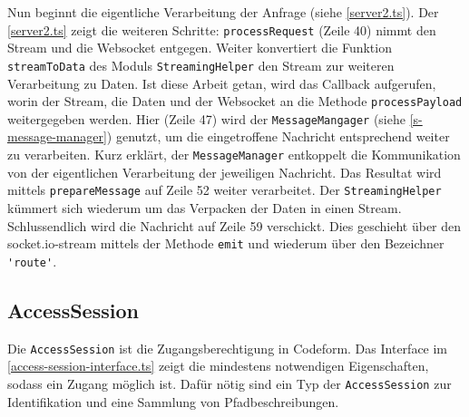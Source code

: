 
Nun beginnt die eigentliche Verarbeitung der Anfrage (siehe \autoref{server2.ts}). Der \autoref{server2.ts} zeigt die weiteren Schritte: \verb|processRequest| (Zeile 40) nimmt den \gls{Stream} und die \gls{Websocket} entgegen. Weiter konvertiert die Funktion \texttt{stream\-To\-Da\-ta} des Moduls \verb|StreamingHelper| den \gls{Stream} zur weiteren Verarbeitung zu Daten. Ist diese Arbeit getan, wird das \gls{Callback} aufgerufen, worin der \gls{Stream}, die Daten und der \gls{Websocket} an die Methode \verb|processPayload| weitergegeben werden. Hier (Zeile 47) wird der \texttt{MessageMangager} (siehe \autoref{s-message-manager}) genutzt, um die eingetroffene Nachricht entsprechend weiter zu verarbeiten. Kurz erklärt, der \texttt{MessageManager} entkoppelt die Kommunikation von der eigentlichen Verarbeitung der jeweiligen Nachricht. Das Resultat wird mittels \texttt{prepareMessage} auf Zeile 52 weiter verarbeitet. Der \texttt{Stream\-ing\-Help\-er} kümmert sich wiederum um das Verpacken der Daten in einen \gls{Stream}. Schlussendlich wird die Nachricht auf Zeile 59 verschickt. Dies geschieht über den socket.io-stream mittels der Methode \texttt{emit} und wiederum über den Bezeichner \verb|'route'|.





\subsection{AccessSession}


Die \texttt{AccessSession} ist die Zugangsberechtigung in Codeform. Das Interface im \autoref{access-session-interface.ts} zeigt die mindestens notwendigen Eigenschaften, sodass ein Zugang möglich ist. Dafür nötig sind ein Typ der \texttt{AccessSession} zur Identifikation und eine Sammlung von Pfadbeschreibungen.

